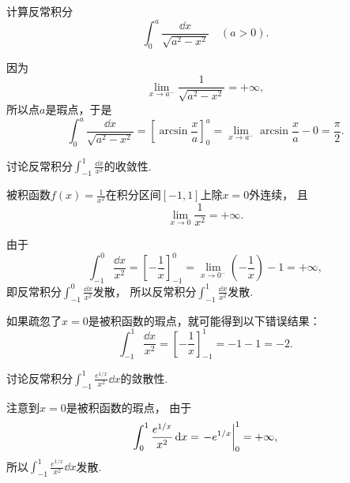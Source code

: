 \begin{example}
计算反常积分\[
	\int_0^a \frac{\dd{x}}{\sqrt{a^2-x^2}}
	\quad(a>0).
\]
\begin{solution}
因为\[
	\lim_{x \to a^-} \frac{1}{\sqrt{a^2-x^2}} = +\infty,
\]
所以点\(a\)是瑕点，于是\[
	\int_0^a \frac{\dd{x}}{\sqrt{a^2-x^2}}
	= \left[ \arcsin\frac{x}{a} \right]_0^a
	= \lim_{x \to a^-} \arcsin\frac{x}{a} - 0 = \frac{\pi}{2}.
\]
\end{solution}
\end{example}

\begin{example}
讨论反常积分\(\int_{-1}^1 \frac{\dd{x}}{x^2}\)的收敛性.
\begin{solution}
被积函数\(f(x) = \frac{1}{x^2}\)在积分区间\([-1,1]\)上除\(x=0\)外连续，
且\[
	\lim_{x\to0} \frac{1}{x^2} = +\infty.
\]

由于\[
	\int_{-1}^0 \frac{\dd{x}}{x^2}
	= \left[-\frac{1}{x}\right]_{-1}^0
	= \lim_{x\to0^-} \left(-\frac{1}{x}\right) - 1
	= +\infty,
\]
即反常积分\(\int_{-1}^0 \frac{\dd{x}}{x^2}\)发散，
所以反常积分\(\int_{-1}^1 \frac{\dd{x}}{x^2}\)发散.
\end{solution}
\end{example}
\begin{remark}
如果疏忽了\(x=0\)是被积函数的瑕点，就可能得到以下错误结果：\[
	\int_{-1}^1 \frac{\dd{x}}{x^2}
	= \left[ -\frac{1}{x} \right]_{-1}^1
	= -1 - 1 = -2.
\]
\end{remark}

\begin{example}
讨论反常积分\(\int_{-1}^1 \frac{e^{1/x}}{x^2} \dd{x}\)的敛散性.
\begin{solution}
注意到\(x=0\)是被积函数的瑕点，
由于\[
	\int_0^1 \frac{e^{1/x}}{x^2} \dd{x}
	= \eval{-e^{1/x}}_0^1
	= +\infty,
\]
所以\(\int_{-1}^1 \frac{e^{1/x}}{x^2} \dd{x}\)发散.
\end{solution}
\end{example}

